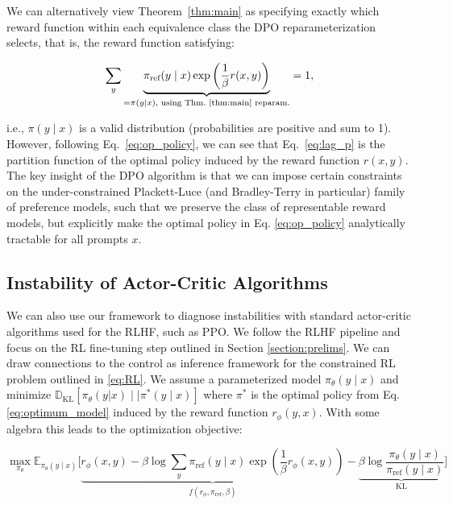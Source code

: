 We can alternatively view Theorem~\ref{thm:main} as specifying exactly which reward function within each equivalence class the DPO reparameterization selects, that is, the reward function satisfying:

\begin{equation}\label{eq:lag_p}
     \sum_{y}\underbrace{\pi_\text{ref}(y\mid x)\exp\left(\frac{1}{\beta}r(x, y)\right)}_{=\pi(y\mid x)\text{, using Thm.~\ref{thm:main} reparam.}} = 1,
\end{equation}

i.e., $\pi(y\mid x)$ is a valid distribution (probabilities are positive and sum to 1). However, following Eq.~\ref{eq:op_policy}, we can see that Eq.~\ref{eq:lag_p} is the partition function of the optimal policy induced by the reward function $r(x, y)$. The key insight of the DPO algorithm is that we can impose certain constraints on the under-constrained Plackett-Luce (and Bradley-Terry in particular) family of preference models, such that we preserve the class of representable reward models, but explicitly make the optimal policy in Eq. \ref{eq:op_policy} analytically tractable for all prompts $x$.

\subsection{Instability of Actor-Critic Algorithms} We can also use our framework to diagnose instabilities with standard actor-critic algorithms used for the RLHF, such as PPO. We follow the RLHF pipeline and focus on the RL fine-tuning step outlined in Section \ref{section:prelims}. We can draw connections to the control as inference framework \cite{levine2018reinforcement} for the constrained RL problem outlined in \ref{eq:RL}. We assume a parameterized model $\pi_{\theta}(y\mid x)$ and minimize $\mathbb{D}_{\text{KL}}[\pi_{\theta}(y|x) \mid \mid \pi^*(y\mid x)]$ where $\pi^*$ is the optimal policy from Eq. \ref{eq:optimum_model} induced by the reward function $r_{\phi}(y, x)$. With some algebra this leads to the optimization objective:

\begin{equation}\label{eq:AC}
    \max_{\pi_{\theta}}\mathbb{E}_{\pi_{\theta}(y\mid x)}\bigg[\underbrace{r_{\phi}(x, y) -\beta\log\sum_{y}\pi_\text{ref}(y\mid x)\exp\left(\frac{1}{\beta}r_{\phi}(x, y)\right)}_{f(r_{\phi}, \pi_\text{ref}, \beta)} - \underbrace{\beta\log\frac{\pi_{\theta}(y\mid x)}{\pi_\text{ref}(y\mid x)}}_{\text{KL}}\bigg]
\end{equation}

